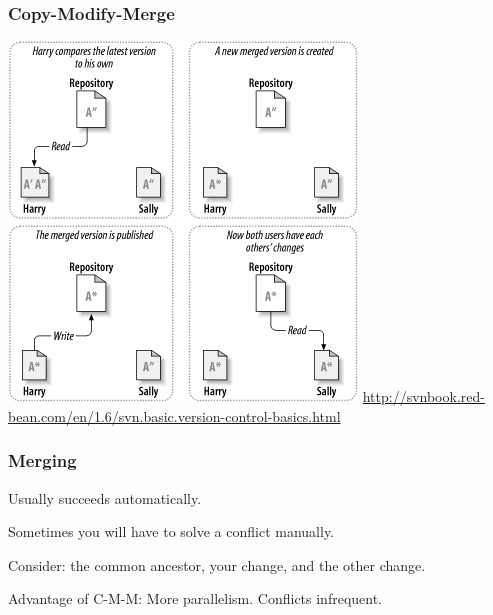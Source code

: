 \begin{frame}
\frametitle{Copy-Modify-Merge}
\begin{changemargin}{1cm}
\begin{center}
	\includegraphics[width=.65\textwidth]{images/ch02dia5.png}
	\hfill {\tiny \url{http://svnbook.red-bean.com/en/1.6/svn.basic.version-control-basics.html}} 
\end{center}


\end{changemargin}
\end{frame}

\begin{frame}
\frametitle{Merging}
\begin{changemargin}{1cm}
Usually succeeds automatically.

Sometimes you will have to solve a conflict manually.

Consider: the common ancestor, your change, and the other change.

Advantage of C-M-M: More parallelism. Conflicts infrequent.

\end{changemargin}
\end{frame}

